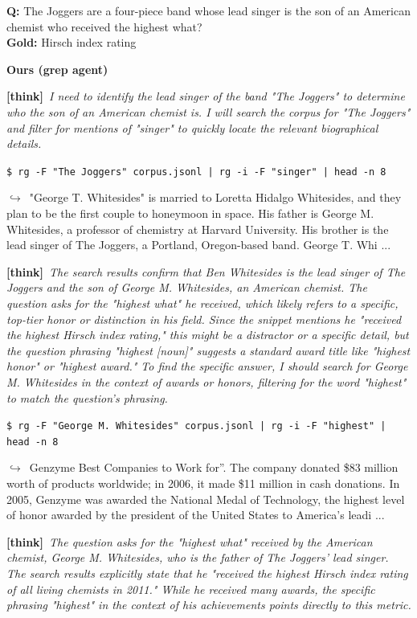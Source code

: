 \documentclass{llmxive}
\providecommand{\cmark}{\ding{51}}
\providecommand{\winbadge}{\colorbox{green!50!black}{\scriptsize\bfseries\,WIN\,}}
\providecommand{\thk}[1]{{\footnotesize\textbf{[think]}\ \textit{#1}\par}}
\providecommand{\cmd}[1]{{\footnotesize\texttt{\$\ #1}\par}}
\providecommand{\retr}[1]{{\footnotesize\quad$\hookrightarrow$\ #1\par}}
\begin{document}
\begin{cmpbox}[label={ex:hotpot-joggers},title={\winbadge\ \ \textsc{HotpotQA -- multi-hop bridge + distinctive phrase}}]
\textbf{Q:} The Joggers are a four-piece band whose lead singer is the son of an American chemist who received the highest what?\\[1pt]
\textbf{Gold:} Hirsch index rating\par\smallskip
\textbf{Ours (grep agent)}~\cmark\par
  \thk{I need to identify the lead singer of the band "The Joggers" to determine who the son of an American chemist is. I will search the corpus for "The Joggers" and filter for mentions of "singer" to quickly locate the relevant biographical details.}
  \cmd{rg -F "The Joggers" corpus.jsonl | rg -i -F "singer" | head -n 8}
  \retr{"George T. Whitesides" is married to Loretta Hidalgo Whitesides, and they plan to be the first couple to honeymoon in space. His father is George M. Whitesides, a professor of chemistry at Harvard University. His brother is the lead singer of The Joggers, a Portland, Oregon-based band. George T. Whi ...}
  \thk{The search results confirm that Ben Whitesides is the lead singer of The Joggers and the son of George M. Whitesides, an American chemist. The question asks for the "highest what" he received, which likely refers to a specific, top-tier honor or distinction in his field. Since the snippet mentions he "received the highest Hirsch index rating," this might be a distractor or a specific detail, but the question phrasing "highest [noun]" suggests a standard award title like "highest honor" or "highest award." To find the specific answer, I should search for George M. Whitesides in the context of awards or honors, filtering for the word "highest" to match the question's phrasing.}
  \cmd{rg -F "George M. Whitesides" corpus.jsonl | rg -i -F "highest" | head -n 8}
  \retr{Genzyme Best Companies to Work for”. The company donated \$83 million worth of products worldwide; in 2006, it made \$11 million in cash donations. In 2005, Genzyme was awarded the National Medal of Technology, the highest level of honor awarded by the president of the United States to America’s leadi ...}
  \thk{The question asks for the "highest what" received by the American chemist, George M. Whitesides, who is the father of The Joggers' lead singer. The search results explicitly state that he "received the highest Hirsch index rating of all living chemists in 2011." While he received many awards, the specific phrasing "highest" in the context of his achievements points directly to this metric.}

\end{cmpbox}
\end{document}
